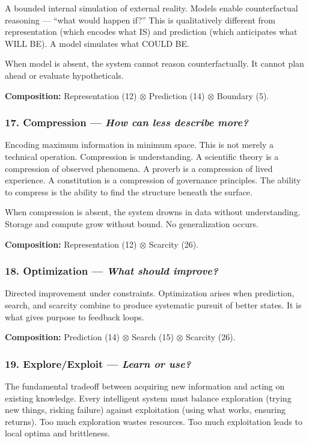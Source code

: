\documentclass[11pt,a4paper]{article}
\newcommand{\question}[1]{\textit{#1}}
\newcommand{\comp}{\mathbin{\otimes}}
\begin{document}
A bounded internal simulation of external reality. Models enable counterfactual reasoning --- ``what would happen if?'' This is qualitatively different from representation (which encodes what IS) and prediction (which anticipates what WILL BE). A model simulates what COULD BE.

When model is absent, the system cannot reason counterfactually. It cannot plan ahead or evaluate hypotheticals.

\textbf{Composition:} Representation (12) $\comp$ Prediction (14) $\comp$ Boundary (5).

\subsubsection{17. Compression --- \question{How can less describe more?}}

Encoding maximum information in minimum space. This is not merely a technical operation. Compression is understanding. A scientific theory is a compression of observed phenomena. A proverb is a compression of lived experience. A constitution is a compression of governance principles. The ability to compress is the ability to find the structure beneath the surface.

When compression is absent, the system drowns in data without understanding. Storage and compute grow without bound. No generalization occurs.

\textbf{Composition:} Representation (12) $\comp$ Scarcity (26).

\subsubsection{18. Optimization --- \question{What should improve?}}

Directed improvement under constraints. Optimization arises when prediction, search, and scarcity combine to produce systematic pursuit of better states. It is what gives purpose to feedback loops.

\textbf{Composition:} Prediction (14) $\comp$ Search (15) $\comp$ Scarcity (26).

\subsubsection{19. Explore/Exploit --- \question{Learn or use?}}

The fundamental tradeoff between acquiring new information and acting on existing knowledge. Every intelligent system must balance exploration (trying new things, risking failure) against exploitation (using what works, ensuring returns). Too much exploration wastes resources. Too much exploitation leads to local optima and brittleness.
\end{document}
